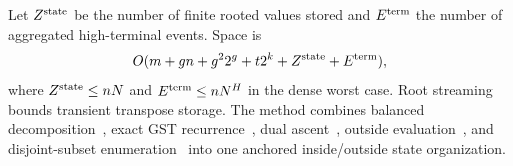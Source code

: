 \documentclass[sigconf,nonacm]{acmart}
\begin{document}
Let $Z^{\rm state}$ be the number of finite rooted values stored and $E^{\rm term}$ the number of aggregated high-terminal events.  Space is
\begin{equation}
 O(m+gn+g^2 2^g+t2^k+Z^{\rm state}+E^{\rm term}),
 \label{eq:space}
\end{equation}
where $Z^{\rm state}\leq nN$ and $E^{\rm term}\leq nN^H$ in the dense worst case.  Root streaming bounds transient transpose storage.  The method combines balanced decomposition~\cite{iwata2019}, exact GST recurrence~\cite{dreyfus1971,pruneddp,gpu4gst}, dual ascent~\cite{wong1984}, outside evaluation~\cite{gildea2020}, and disjoint-subset enumeration~\cite{bjorklund2007} into one anchored inside/outside state organization.



\end{document}
